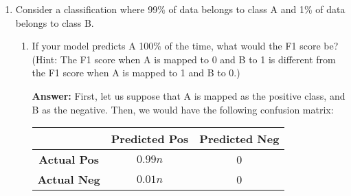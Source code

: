 \documentclass{article}
\newenvironment{QandA}{\begin{enumerate}[label=\arabic*.]}{\end{enumerate}}
\newenvironment{InnerQandA}{\begin{enumerate}[label=\roman*.]}{\end{enumerate}}
\newenvironment{answer}{\par\normalfont \textbf{Answer:}}{}
\begin{document}
\begin{QandA}
    \begin{InnerQandA}
        \item Calculate the model’s precision, recall, and F1.
        \begin{answer}
            \begin{align*}
                \text{Precision} &= \frac{\text{TP}}{\text{TP} + \text{FP}} = \frac{30}{30 + 5} = 0.85\\
                \text{Recall} &= \frac{\text{TP}}{\text{TP} + \text{FN}} = \frac{30}{30 + 20} = 0.6\\
                \text{F}_1 &= \frac{2 \cdot \text{Precision} \cdot \text{Recall}}{\text{Precision} + \text{Recall}} = \frac{2 \cdot 0.85 \cdot 0.6}{0.85 + 0.6} = 0.7034
            \end{align*}
        \end{answer}

        \item What can we do to improve the model’s performance?
        \begin{answer}
            The model is very conservative, in the sense that it rarely outputs the positive class (large number of False Negatives). The goal of improving the model's performance might be achieved by being more aggressive, and predicting the positive class more often. One way to do this is by lowering the threshold for which we predict a positive vs. negative class.
        \end{answer}
    \end{InnerQandA}

    \item Consider a classification where 99\% of data belongs to class A and 1\% of data belongs to class B.
    \begin{InnerQandA}
         \item If your model predicts A 100\% of the time, what would the F1 score be? (Hint: The F1 score when A is mapped to 0 and B to 1 is different from the F1 score when A is mapped to 1 and B to 0.)
         \begin{answer}
             First, let us suppose that A is mapped as the positive class, and B as the negative. Then, we would have the following confusion matrix:
            \begin{table}[htb!]
            \centering
            \begin{tabular}{|c|c|c|}
            \hline
                                  & \textbf{Predicted Pos} & \textbf{Predicted Neg} \\ \hline
            \textbf{Actual Pos}  & $0.99n$                      & 0                       \\ \hline
            \textbf{Actual Neg} & $0.01n$                       & 0                       \\ \hline
            \end{tabular}
            \end{table}


\end{answer}
\end{InnerQandA}
\end{QandA}
\end{document}

